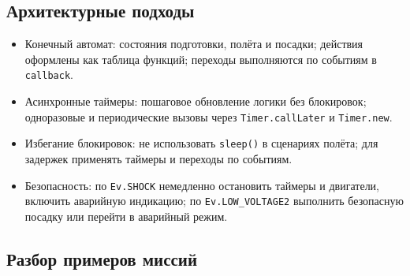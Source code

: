 \subsection{Архитектурные подходы}
\begin{itemize}
  \item Конечный автомат: состояния подготовки, полёта и посадки; действия оформлены как таблица функций; переходы выполняются по событиям в \texttt{callback}.
  \item Асинхронные таймеры: пошаговое обновление логики без блокировок; одноразовые и периодические вызовы через \texttt{Timer.callLater} и \texttt{Timer.new}.
  \item Избегание блокировок: не использовать \texttt{sleep()} в сценариях полёта; для задержек применять таймеры и переходы по событиям.
  \item Безопасность: по \texttt{Ev.SHOCK} немедленно остановить таймеры и двигатели, включить аварийную индикацию; по \texttt{Ev.LOW\_VOLTAGE2} выполнить безопасную посадку или перейти в аварийный режим.
\end{itemize}

\subsection{Разбор примеров миссий}
